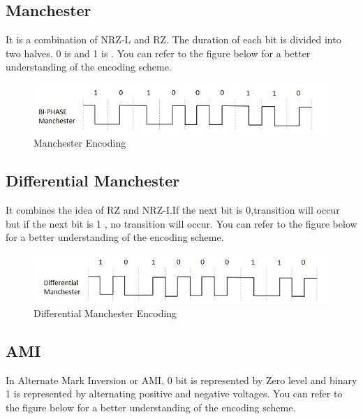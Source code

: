 \documentclass[10pt,journal,compsoc]{IEEEtran}
\begin{document}
\subsection{Manchester}
It is a combination of NRZ-L and RZ. The duration of each bit is divided into two halves. 0 is  and 1 is . You can refer to the figure below for a better understanding of the encoding scheme.

\begin{figure}[H]
\centering
\includegraphics[scale=0.55]{encoding-manchester.png}
\caption{Manchester Encoding}
\end{figure}


\subsection{Differential Manchester}
It combines the idea of RZ and NRZ-I.If the next bit is 0,transition will occur but if the next bit is 1 , no transition will occur. You can refer to the figure below for a better understanding of the encoding scheme.

\begin{figure}[H]
\centering
\includegraphics[scale=0.55]{encoding-diffmanchester.png}
\caption{Differential Manchester Encoding}
\end{figure}



\subsection{AMI}
In Alternate Mark Inversion or AMI, 0 bit is represented by Zero level and binary 1 is represented by alternating positive and negative voltages. You can refer to the figure below for a better understanding of the encoding scheme.
\end{document}
